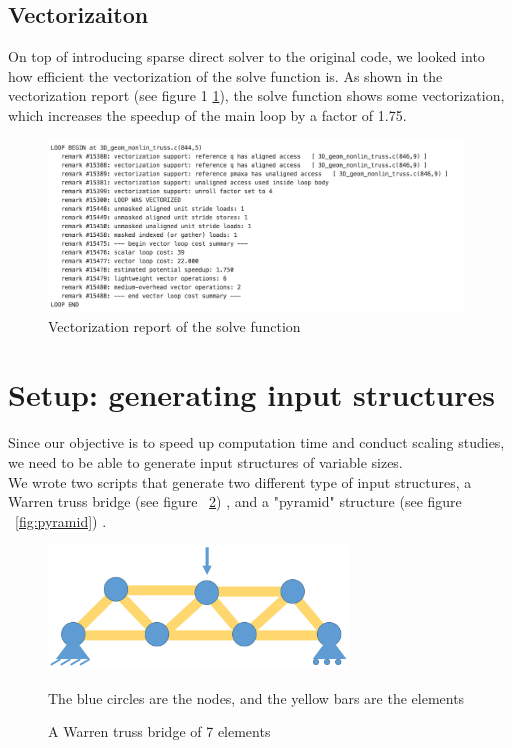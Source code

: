 \documentclass[11pt]{article}
\begin{document}
\subsection{Vectorizaiton}
On top of introducing sparse direct solver to the original code, we looked into how efficient the vectorization of the solve function is. As shown in the vectorization report (see figure 1 \ref{fig:vectorization}), the solve function shows some vectorization, which increases the speedup of the main loop by a factor of 1.75. 

\begin{figure}[h]
	\begin{center}
		
		\includegraphics[width=11cm]{vectorization}
		\caption{Vectorization report of the solve function}
		\label{fig:vectorization}
	\end{center}
	
\end{figure}

\section{Setup: generating input structures}\label{sec:setup}

Since our objective is to speed up computation time and conduct scaling studies, we need to be able to generate input structures of variable sizes.\\

We wrote two scripts that generate two different type of input structures, a Warren truss bridge (see figure ~\ref{fig:chain}) , and a "pyramid" structure (see figure ~\ref{fig:pyramid}) .


\begin{figure}[h]
\begin{center}

\includegraphics[width=8cm]{chain}
\caption{A Warren truss bridge of 7 elements}
\label{fig:chain}
The blue circles are the nodes, and the yellow bars are the elements
\end{center}

\end{figure}
\end{document}
